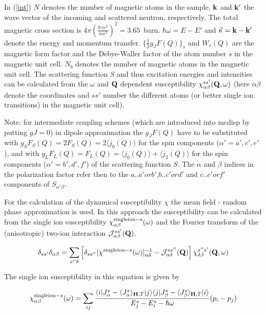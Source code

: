  
In (\ref{int}) 
$N$ denotes the number of magnetic atoms in the sample, $\mathbf k$ and $\mathbf k'$ the wave vector of the incoming and
scattered neutron, respectively.
The total magnetic cross section is $4\pi\left(\frac{\hbar \gamma e^2}{mc^2}\right)^2
=3.65$~barn. 
$\hbar \omega=E-E'$  and
$\vec\kappa =\mathbf k-\mathbf k'$  denote the energy and momentum transfer. $\{\frac{1}{2} g_J F(Q)\}_{s}$ and $W_s(Q)$ are  %
the magnetic form factor and the Debye-Waller
factor of the atom number $s$ in the magnetic unit cell. $N_b$ denotes the number of magnetic
atoms in the magnetic unit cell.
The scattering function $S$ and thus excitation energies and intensities can be calculated from the 
 $\omega$ and $\mathbf Q$ dependent susceptibility $\chi_{\alpha\beta}^{ss'}({\mathbf Q},\omega)$
(here $\alpha\beta$ denote the coordinates and $ss'$ number the different
atoms (or better single ion transitions) in the magnetic unit cell). 

{\tiny Note: for intermediate coupling schemes (which are introduced into mcdisp by putting $gJ=0$) in 
dipole approximation the 
$g_J F(Q)$ have to be substituted with $g_S F_S(Q)=2F_S(Q)=2 \langle j_0 (Q) \rangle$ for the spin components %
($\alpha'=a',c',e'$),
and with  $g_L F_L(Q)=F_L(Q)=\langle j_0 (Q) \rangle + \langle j_2 (Q) \rangle $ 
for the spin components ($\alpha'=b',d',f'$) of the scattering function $S$. The $\alpha$ and $\beta$ indices in 
the polarization factor refer then to  the $a .. a'or b'$,$b ..c'or d'$ and $c .. e'or f'$ components of %
$S_{\alpha'\beta'}$.
}

For the calculation of the 
dynamical susceptibility $\chi$ the 
mean field - random phase approximation is used. 
In this approach the susceptibility can be calculated
from the single ion susceptibility $\chi^{{\rm single ion-} s}_{\alpha\beta}(\omega)$
and the Fourier transform of the (anisotropic) two-ion interaction
${\mathcal J}_{\alpha\beta}^{ss'}({\mathbf Q})$.

\begin{equation}\label{mfrpa}
\delta_{ss'}\delta_{\alpha\beta}=
\sum_{s''\delta}\left[
\delta_{ss''}[\chi^{{\rm single ion-} s}(\omega)]^{-1}_{\alpha\delta}
-{\mathcal J}_{\alpha\delta}^{ss''}({\mathbf Q})
\right]
\chi_{\delta\beta}^{s''s'}({\mathbf Q},\omega)
\end{equation}

The single ion susceptibility in this  equation is given by

\begin{equation}
\label{singleionchi}
\chi^{{\rm single ion-} s}_{\alpha\beta}(\omega)=
\sum_{ij} \frac{\langle i|J^s_{\alpha}-\langle J^s_{\alpha}\rangle_{\mbf H,T}|j\rangle\langle j|J^s_{\beta}-\langle J^s_{\beta}\rangle_{\mbf %
H,T}|i\rangle}{E^s_j-E^s_i-\hbar \omega}
(p_i-p_j)
\end{equation}


